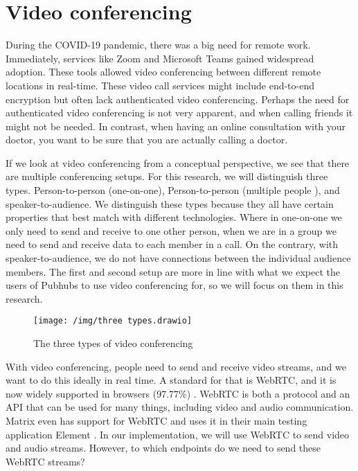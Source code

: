 \documentclass[11pt,a4paper]{article}
\begin{document}
    \section{Video conferencing}
    During the COVID-19 pandemic, there was a big need for remote work. Immediately, services like Zoom \cite{Zoom}
    and Microsoft Teams  \cite{MSTeams}
    gained widespread adoption. These tools allowed video conferencing between different remote locations in real-time.
    These video call services might include end-to-end encryption but often lack authenticated video conferencing.
    Perhaps the need for authenticated video conferencing is not very apparent, and when calling friends it might not be
    needed. In contrast, when having an online consultation with your doctor, you want to be sure that you are actually
    calling a doctor.

    If we look at video conferencing from a conceptual perspective, we see that there are multiple conferencing setups.
    For this research, we will distinguish three types. Person-to-person (one-on-one), Person-to-person (multiple people
    ), and speaker-to-audience. We distinguish these types because they all have certain properties that best match with
    different technologies. Where in one-on-one we only need to send and receive to one other person, when we are in a
    group we need to send and receive data to each member in a call. On the contrary, with speaker-to-audience, we do
    not have connections between the individual audience members. The first and second setup are more in line with what
    we expect the users of Pubhubs to use video conferencing for, so we will focus on them in this research.

    \begin{figure}[!hbt]
        \centering
        \texttt{[image: /img/three types.drawio]}
        \caption{The three types of video conferencing}
        \label{fig:enter-label}
    \end{figure}

    With video conferencing, people need to send and receive video streams, and we want to do this ideally in real time.
    A standard for that is WebRTC, and it is now widely supported in browsers (97.77\%) \cite{CIUIWEBRTC}
    . WebRTC is both a protocol and an API that can be used for many things, including video and audio communication.
    Matrix even has support for WebRTC and uses it in their main testing application Element \cite{ELEMENT}
    . In our implementation, we will use WebRTC to send video and audio streams. However, to which endpoints do we need
    to send these WebRTC streams?
\end{document}
